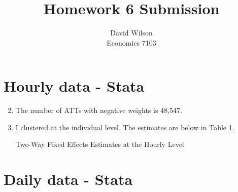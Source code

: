 \documentclass{article}
\title{Homework 6 Submission}
\author{David Wilson \\ Economics 7103}
\begin{document}
  
\maketitle

\section{Hourly data - Stata}

\begin{enumerate}
\setcounter{enumi}{1}
\item The number of ATTs with negative weights is 48,547.


\item I clustered at the individual level. The estimates are below in Table 1.

\begin{table}[H]
    \centering
    \caption{Two-Way Fixed Effects Estimates at the Hourly Level}
    \begin{threepart}
        
    \end{threepart}
\end{table}
\end{enumerate}
\section{Daily data - Stata}
\end{document}
